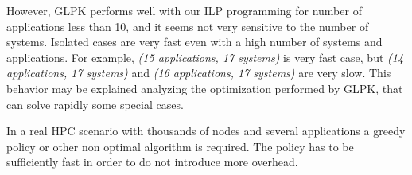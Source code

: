 However, GLPK performs well with our ILP programming for number of applications
less than 10, and it seems not very sensitive to the number of systems.
Isolated cases are very fast even with a high number of systems and
applications. For example, \emph{(15 applications, 17 systems)} is very fast
case, but \emph{(14 applications, 17 systems)} and \emph{(16 applications,
17 systems)} are very slow. This behavior may be explained analyzing the
optimization performed by GLPK, that can solve rapidly some special cases.

In a real HPC scenario with thousands of nodes and several applications
a greedy policy or other non optimal algorithm is required. The policy has to
be sufficiently fast in order to do not introduce more overhead.

